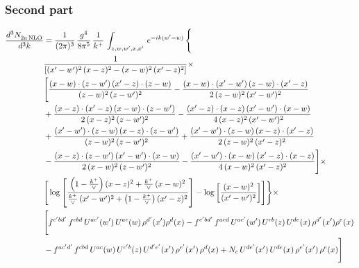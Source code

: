 \documentclass[9pt]{article}
\numberwithin{equation}{section}
\begin{document}
\subsubsection{Second part}
\begin{align}
    \frac{d^{3}N_{2a\,\rm NLO}^{\rm}}{d^{3}k}  & =  \frac{1}{(2\pi)^{3}}\, \frac{g^{4}}{8\pi^{5}}\,\frac{1}{k^{+}}\,\int_{z,w,w^{\prime},x,x'}\, e^{-ik(w^{\prime}-w)}\, \Bigg\{\notag \\
& \frac{1}{\left[(x'-w')^{2}\, (x-z)^{2}-(x-w)^{2}\, (x'-z)^{2}\right]}\times\,\notag \\ & \Bigg[\frac{(x-w)\cdot (z-w')\, (x'-z)\cdot (z-w)}{(z-w)^{2}\,(z-w')^{2}}-\frac{(x-w)\cdot (x'-w')\, (z-w)\cdot (x'-z)}{2\, (z-w)^{2}\, (x'-w')^{2}}\notag \\ & + \frac{(x-z)\cdot (x'-z)\, (x-w)\cdot (z-w')}{2\, (x-z)^{2}\, (z-w')^{2}}-\frac{(x'-z)\cdot (x-z)\, (x'-w')\cdot (x-w)}{4\, (x-z)^{2}\, (x'-w')^{2}}\notag \\ & + \frac{(x'-w')\cdot (z-w)\, (x-z)\cdot (z-w')}{(z-w)^{2}\,(z-w')^{2}}+\frac{(x'-w')\cdot (z-w)\, (x-z)\cdot (x'-z)}{2\, (z-w)^{2}\, (x'-z)^{2}}\notag \\ & - \frac{(x-z)\cdot (z-w')\, (x'-w')\cdot (x-w)}{2\, (x-w)^{2}\, (z-w')^{2}} -\frac{(x'-w')\cdot (x-w)\, (x'-z)\cdot (x-z)}{4\, (x-w)^{2}\, (x'-z)^{2}}\Bigg]\times\notag \\ &  \Bigg[\log{\left[\frac{\left(1-\frac{k^{+}}{\vee}\right)(x-z)^{2}+\frac{k^{+}}{\vee}\,(x-w)^{2}}{\frac{k^{+}}{\vee}\, (x'-w')^{2} + \left(1-\frac{k^{+}}{\vee}\right) (x'-z)^{2}}\right]}-\log{\left[\frac{(x-w)^{2}}{(x'-w')^{2}}\right]}\Bigg]\Bigg\} \times\, \notag \\ & \Bigg[f^{c'bd'}\,f^{cbd}\, U^{ac'}(w')\,U^{ac}(w)\,\rho^{d'}(x')\rho^{d}(x)- f^{c'bd'}\,f^{acd}\,U^{ac'}(w')\,U^{cb}(z)\,U^{de}(x)\,\rho^{d'}(x')\rho^{e}(x) \notag \\ & -f^{ac'd'}\,f^{cbd}\,U^{ac}(w)\,U^{c'b}(z)\,U^{d'e'}(x')\,\rho^{e'}(x')\,\rho^{d}(x) +N_{c}\,U^{de'}(x')\,U^{de}(x)\,\rho^{e'}(x')\,\rho^{e}(x)\Bigg]
\end{align}
\end{document}
